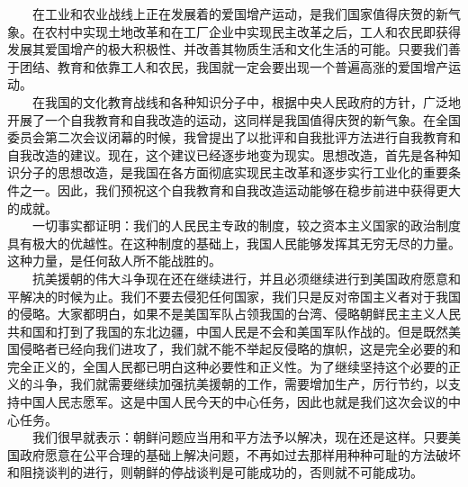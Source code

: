 \documentclass[cn,11pt,chinese]{elegantbook}
\begin{document}
　　在工业和农业战线上正在发展着的爱国增产运动，是我们国家值得庆贺的新气象。在农村中实现土地改革和在工厂企业中实现民主改革之后，工人和农民即获得发展其爱国增产的极大积极性、并改善其物质生活和文化生活的可能。只要我们善于团结、教育和依靠工人和农民，我国就一定会要出现一个普遍高涨的爱国增产运动。\\
　　在我国的文化教育战线和各种知识分子中，根据中央人民政府的方针，广泛地开展了一个自我教育和自我改造的运动，这同样是我国值得庆贺的新气象。在全国委员会第二次会议闭幕的时候，我曾提出了以批评和自我批评方法进行自我教育和自我改造的建议。现在，这个建议已经逐步地变为现实。思想改造，首先是各种知识分子的思想改造，是我国在各方面彻底实现民主改革和逐步实行工业化的重要条件之一。因此，我们预祝这个自我教育和自我改造运动能够在稳步前进中获得更大的成就。\\
　　一切事实都证明：我们的人民民主专政的制度，较之资本主义国家的政治制度具有极大的优越性。在这种制度的基础上，我国人民能够发挥其无穷无尽的力量。这种力量，是任何敌人所不能战胜的。\\
　　抗美援朝的伟大斗争现在还在继续进行，并且必须继续进行到美国政府愿意和平解决的时候为止。我们不要去侵犯任何国家，我们只是反对帝国主义者对于我国的侵略。大家都明白，如果不是美国军队占领我国的台湾、侵略朝鲜民主主义人民共和国和打到了我国的东北边疆，中国人民是不会和美国军队作战的。但是既然美国侵略者已经向我们进攻了，我们就不能不举起反侵略的旗帜，这是完全必要的和完全正义的，全国人民都已明白这种必要性和正义性。为了继续坚持这个必要的正义的斗争，我们就需要继续加强抗美援朝的工作，需要增加生产，厉行节约，以支持中国人民志愿军。这是中国人民今天的中心任务，因此也就是我们这次会议的中心任务。\\
　　我们很早就表示：朝鲜问题应当用和平方法予以解决，现在还是这样。只要美国政府愿意在公平合理的基础上解决问题，不再如过去那样用种种可耻的方法破坏和阻挠谈判的进行，则朝鲜的停战谈判是可能成功的，否则就不可能成功。\\
\end{document}
